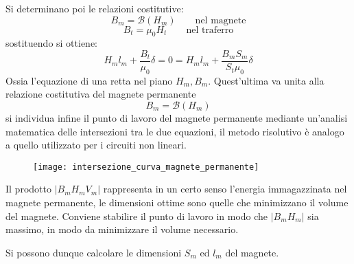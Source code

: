 Si determinano poi le relazioni costitutive:
$$
B_m = \mathcal{B}\left(H_m\right)\qquad \text{nel magnete}
$$
$$
B_t = \mu_0 H_t\qquad \text{nel traferro}
$$
sostituendo si ottiene:
$$
H_ml_m + \frac{B_t}{\mu_0}\delta = 0 = H_ml_m + \frac{B_mS_m}{S_t\mu_0}\delta
$$
Ossia l'equazione di una retta nel piano $H_m,B_m$.
Quest'ultima va unita alla relazione costitutiva del magnete permanente
$$
B_m = \mathcal{B}\left(H_m\right)
$$
si individua infine il punto di lavoro del magnete permanente mediante un'analisi
matematica delle intersezioni tra le due equazioni, il metodo risolutivo è analogo
a quello utilizzato per i circuiti non lineari.
\begin{figure}[H]
\centering
\texttt{[image: intersezione\_curva\_magnete\_permanente]}
\end{figure}
Il prodotto $\left|B_mH_mV_m\right|$ rappresenta in un certo senso l'energia immagazzinata
nel magnete permanente, le dimensioni ottime sono quelle che minimizzano il volume del 
magnete.
Conviene stabilire il punto di lavoro in modo che $\left|B_mH_m\right|$ sia massimo,
in modo da minimizzare il volume necessario.

Si possono dunque calcolare le dimensioni $S_m$ ed $l_m$ del magnete.
